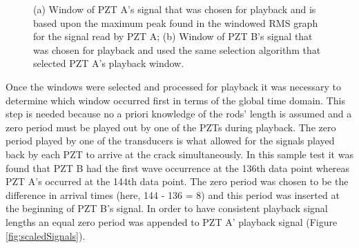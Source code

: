 \begin{figure}
\begin{subfigmatrix}{2}
\end{subfigmatrix}

  \caption
  { \label{fig:chosenSignals}
(a) Window of PZT A's signal that was chosen for playback and is based upon the maximum peak found in the windowed RMS graph for the signal read by PZT A;
(b) Window of PZT B's signal that was chosen for playback and used the same selection algorithm that selected PZT A's playback window.
}
\end{figure}

Once the windows were selected and processed for playback it was necessary to determine which window occurred first in terms of the global time domain. This step is needed because no a priori knowledge of the rods' length is assumed and a zero period must be played out by one of the PZTs during playback. The zero period played by one of the transducers is what allowed for the signals played back by each PZT to arrive at the crack simultaneously. In this sample test it was found that PZT B had the first wave occurrence at the 136th data point whereas PZT A's occurred at the 144th data point.  The zero period was chosen to be the difference in arrival times (here, 144 - 136 = 8) and this period was inserted at the beginning of PZT B's signal. In order to have consistent playback signal lengths an equal zero period was appended to PZT A' playback signal (Figure \ref{fig:scaledSignals}).

